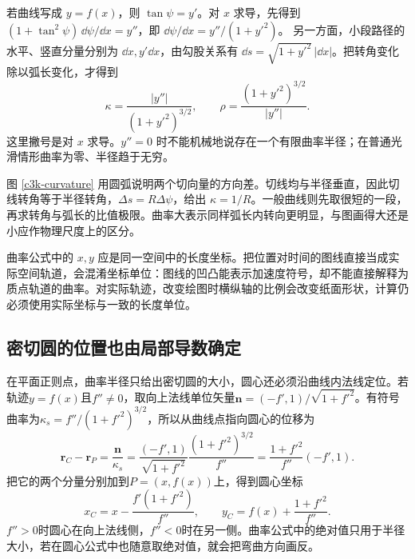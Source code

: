 若曲线写成 $y=f(x)$，则 $\tan\psi=y'$。对 $x$ 求导，先得到
$(1+\tan^2\psi)\,\dd\psi/\dd x=y''$，即
$\dd\psi/\dd x=y''/(1+y'^2)$。
另一方面，小段路径的水平、竖直分量分别为 $\dd x,y'\dd x$，由勾股关系有 $\dd s=\sqrt{1+y'^2}\,|\dd x|$。把转角变化除以弧长变化，才得到
\[
 \kappa=\frac{|y''|}{(1+y'^2)^{3/2}},\qquad
 \boxed{\rho=\frac{(1+y'^2)^{3/2}}{|y''|}}.
\]
这里撇号是对 $x$ 求导。$y''=0$ 时不能机械地说存在一个有限曲率半径；在普通光滑情形曲率为零、半径趋于无穷。

图 \ref{c3k-curvature} 用圆弧说明两个切向量的方向差。切线均与半径垂直，因此切线转角等于半径转角，$\Delta s=R\Delta\psi$，给出 $\kappa=1/R$。一般曲线则先取很短的一段，再求转角与弧长的比值极限。曲率大表示同样弧长内转向更明显，与图画得大还是小应作物理尺度上的区分。

曲率公式中的 $x,y$ 应是同一空间中的长度坐标。把位置对时间的图线直接当成实际空间轨道，会混淆坐标单位：图线的凹凸能表示加速度符号，却不能直接解释为质点轨道的曲率。对实际轨迹，改变绘图时横纵轴的比例会改变纸面形状，计算仍必须使用实际坐标与一致的长度单位。

\subsection{密切圆的位置也由局部导数确定}
在平面正则点，曲率半径只给出密切圆的大小，圆心还必须沿曲线内法线定位。若轨迹$y=f(x)$且$f''\ne0$，取向上法线单位矢量$\bm n=(-f',1)/\sqrt{1+f'^2}$。有符号曲率为$\kappa_s=f''/(1+f'^2)^{3/2}$，所以从曲线点指向圆心的位移为
\[
\bm r_C-\bm r_P=\frac{\bm n}{\kappa_s}
=\frac{(-f',1)}{\sqrt{1+f'^2}}\frac{(1+f'^2)^{3/2}}{f''}
=\frac{1+f'^2}{f''}(-f',1).
\]
把它的两个分量分别加到$P=(x,f(x))$上，得到圆心坐标
\[x_C=x-\frac{f'(1+f'^2)}{f''},\qquad
y_C=f(x)+\frac{1+f'^2}{f''}.\]
$f''>0$时圆心在向上法线侧，$f''<0$时在另一侧。曲率公式中的绝对值只用于半径大小，若在圆心公式中也随意取绝对值，就会把弯曲方向画反。

